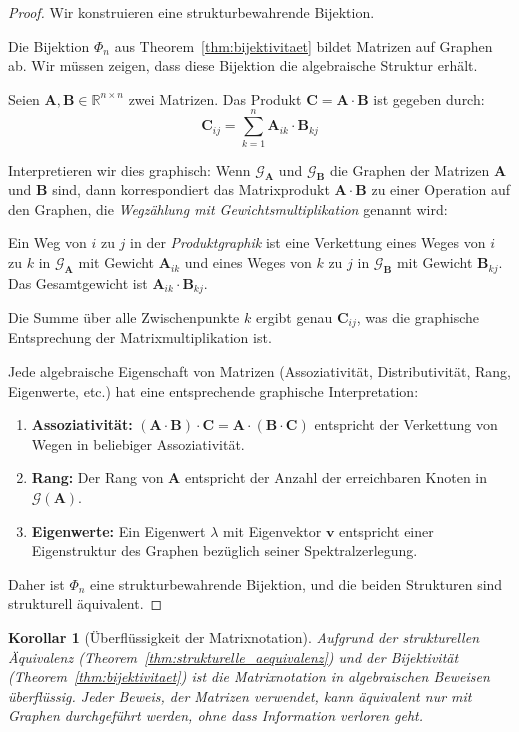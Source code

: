 \documentclass[12pt, a4paper]{article}
\newtheorem{corollary}[theorem]{Korollar}
\theoremstyle{definition}
\theoremstyle{remark}
\newcommand{\R}{\mathbb{R}}
\newcommand{\vA}{\bm{A}}
\newcommand{\vB}{\bm{B}}
\newcommand{\vC}{\bm{C}}
\newcommand{\Graph}{\mathcal{G}}
\begin{document}
\begin{proof}
Wir konstruieren eine strukturbewahrende Bijektion.

Die Bijektion $\Phi_n$ aus Theorem~\ref{thm:bijektivitaet} bildet Matrizen auf Graphen ab. Wir müssen zeigen, dass diese Bijektion die algebraische Struktur erhält.

Seien $\vA, \vB \in \R^{n \times n}$ zwei Matrizen. Das Produkt $\vC = \vA \cdot \vB$ ist gegeben durch:
\[
  \vC_{ij} = \sum_{k=1}^{n} \vA_{ik} \cdot \vB_{kj}
\]

Interpretieren wir dies graphisch: Wenn $\Graph_{\vA}$ und $\Graph_{\vB}$ die Graphen der Matrizen $\vA$ und $\vB$ sind, dann korrespondiert das Matrixprodukt $\vA \cdot \vB$ zu einer Operation auf den Graphen, die \emph{Wegzählung mit Gewichtsmultiplikation} genannt wird:

Ein Weg von $i$ zu $j$ in der \emph{Produktgraphik} ist eine Verkettung eines Weges von $i$ zu $k$ in $\Graph_{\vA}$ mit Gewicht $\vA_{ik}$ und eines Weges von $k$ zu $j$ in $\Graph_{\vB}$ mit Gewicht $\vB_{kj}$. Das Gesamtgewicht ist $\vA_{ik} \cdot \vB_{kj}$.

Die Summe über alle Zwischenpunkte $k$ ergibt genau $\vC_{ij}$, was die graphische Entsprechung der Matrixmultiplikation ist.

Jede algebraische Eigenschaft von Matrizen (Assoziativität, Distributivität, Rang, Eigenwerte, etc.) hat eine entsprechende graphische Interpretation:
\begin{enumerate}[label=(\alph*)]
  \item \textbf{Assoziativität:} $(\vA \cdot \vB) \cdot \vC = \vA \cdot (\vB \cdot \vC)$ entspricht der Verkettung von Wegen in beliebiger Assoziativität.
  \item \textbf{Rang:} Der Rang von $\vA$ entspricht der Anzahl der erreichbaren Knoten in $\Graph(\vA)$.
  \item \textbf{Eigenwerte:} Ein Eigenwert $\lambda$ mit Eigenvektor $\mathbf{v}$ entspricht einer Eigenstruktur des Graphen bezüglich seiner Spektralzerlegung.
\end{enumerate}

Daher ist $\Phi_n$ eine strukturbewahrende Bijektion, und die beiden Strukturen sind strukturell äquivalent.
\end{proof}

\begin{corollary}[Überflüssigkeit der Matrixnotation]
\label{cor:matrix_ueberfluessig}
Aufgrund der strukturellen Äquivalenz (Theorem~\ref{thm:strukturelle_aequivalenz}) und der Bijektivität (Theorem~\ref{thm:bijektivitaet}) ist die Matrixnotation in algebraischen Beweisen überflüssig. Jeder Beweis, der Matrizen verwendet, kann äquivalent nur mit Graphen durchgeführt werden, ohne dass Information verloren geht.
\end{corollary}
\end{document}
